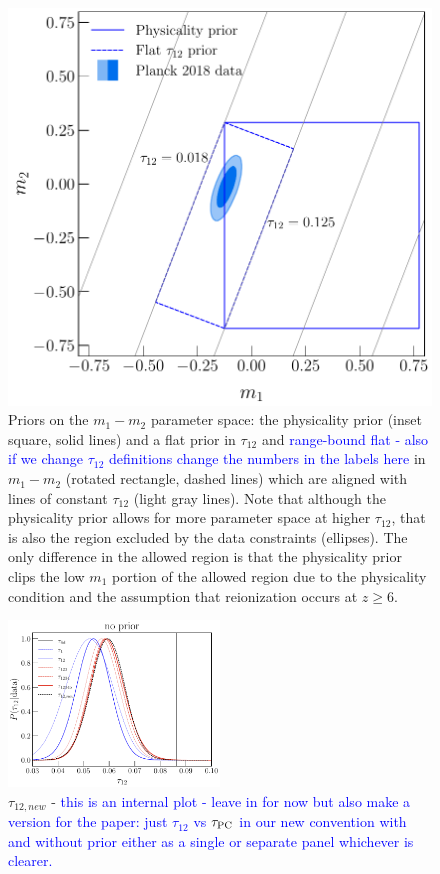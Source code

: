 \documentclass[prd,twocolumn,amsmath,amssymb,floatfix,superscriptaddress,nofootinbib]{revtex4-1}
\newcommand{\wh}[1]{\textcolor{blue}{#1}}
\newcommand{\ch}[1]{\textcolor{red}{#1}}
\begin{document}
{ \begin{figure}
          \includegraphics[width=0.9\columnwidth]{paper/plots/pl18_pc_zmax30_pliklite_srollv2_1015_plot_rotated_box_flat_tau_prior_fac_0.8.pdf}
          \caption {Priors on the $m_1-m_2$ parameter space: the physicality prior (inset square, solid lines) and a flat prior in
           $\tau_{12}$ and \wh{range-bound flat - also if we change $\tau_{12}$ definitions change the numbers in the labels here} in $m_1-m_2$ (rotated rectangle, dashed lines) 
           which are aligned with lines of constant $\tau_{12}$ (light gray lines). Note that although the physicality prior allows for more parameter space at higher $\tau_{12}$, that is also the region excluded by the data constraints (ellipses). The only difference in the allowed region is that the physicality prior clips the low $m_1$ portion of the allowed region due to the physicality condition and the assumption that reionization occurs at $z\ge 6$.} 
          \label{fig:prior_box}
\end{figure}

\begin{figure}[ht]
\includegraphics[width=0.5\textwidth]{results/tau_pc_decomposition/plot_taumj_decomposition_apply_cut_False_pl18_pc_zmax30_pliklite_srollv2_1015.pdf}
\caption{$\tau_{12,new}$ - \wh{this is an internal plot - leave in for now but also make a version for the paper: just $\tau_{12}$ vs $\tau_{\rm PC}$ in our new convention with and without prior either as a single or separate panel whichever is clearer.}}
\label{fig:tau12}
\end{figure}

}
\end{document}
